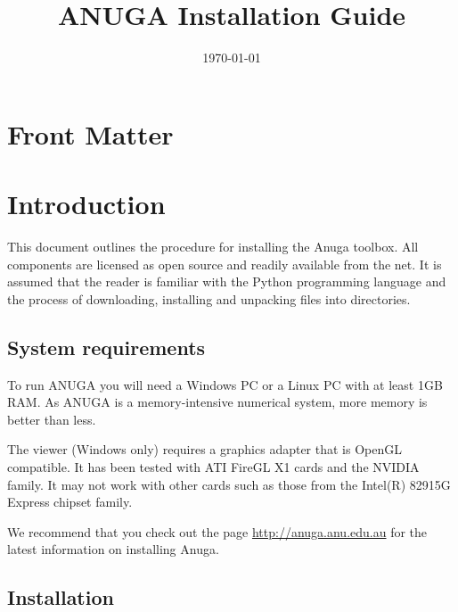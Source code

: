 \documentclass{manual}
\title{ANUGA Installation Guide}
\date{\today}                   %
\begin{document}
\maketitle



\ifhtml
\chapter*{Front Matter\label{front}}
\fi




\chapter{Introduction}

This document outlines the procedure for installing the Anuga toolbox.
All components are licensed as open source and readily available from the net.
It is assumed that the reader is familiar with the Python programming language
and the process of downloading, installing and unpacking files into directories.


\section{System requirements}
\label{sec:requirements}

To run ANUGA you will need a Windows PC or a Linux PC with at 
least 1GB RAM.  As ANUGA is a memory-intensive numerical system, more memory is better than less.

The viewer (Windows only) requires a graphics adapter that
is OpenGL compatible. It has been tested with ATI FireGL X1 cards
and the NVIDIA family. It may not work with other cards such as those from the
Intel(R) 82915G Express chipset family.

We recommend that you check out the page \url{http://anuga.anu.edu.au} for the latest information on installing Anuga. 



\section{Installation}
\end{document}
